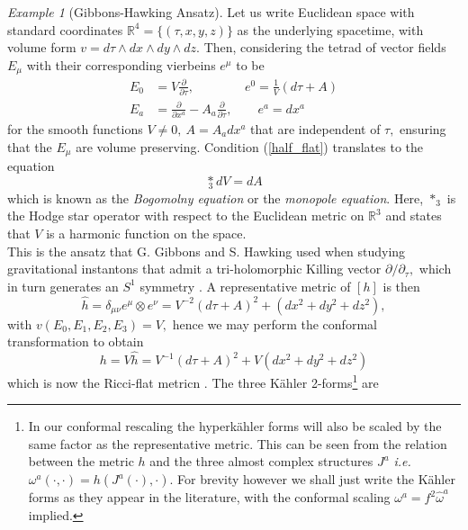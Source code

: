 \documentclass[a4paper,12pt, onecolumn, notitlepage]{article}
\theoremstyle{definition}
\theoremstyle{remark}
\newtheorem{ex}[thm]{Example}
\newcommand{\ie}{\emph{i.e.} }
\newcommand{\w}{\omega}
\newcommand{\m}{\mu}
\newcommand{\n}{\nu}
\newcommand{\ddt}[1]{\frac{\partial #1}{\partial \tau}}
\newcommand{\dd}[2]{\frac{\partial #1}{\partial #2}}
\newcommand{\K}{K\"ahler }
\newcommand{\HK}{hyperk\"ahler }
\newcommand{\x}[1]{x^{#1}}
\newcommand{\R}{\mathbb{R}}
\begin{document}
\begin{ex}[Gibbons-Hawking Ansatz]
	Let us write Euclidean space with standard coordinates $\R^{4} = \{(\tau,x,y,z)\}$ as the underlying spacetime, with volume form $v=d\tau\wedge dx\wedge dy\wedge dz.$ Then, considering the tetrad of vector fields $E_{\m}$ with their corresponding vierbeins $e^{\m}$ to be
	\begin{align*}
	\label{gh_vectors}
		E_{0} &= V\dd{}{\tau},\qquad\qquad e^{0} = \frac{1}{V}(d\tau+A)\\
		E_{a} &= \dd{}{\x{a}} - A_{a}\ddt{},\qquad e^{a} = dx^{a}
	\end{align*}
	for the smooth functions $V\neq0,\ A = A_{a}dx^{a}$ that are independent of $\tau,$ ensuring that the $E_{\m}$ are volume preserving. Condition (\ref{half_flat}) translates to the equation
	\begin{equation}
	\label{monopole}
		\underset{3}\ast dV = dA
	\end{equation}
	which is known as the 
	\emph{Bogomolny equation} or the \emph{monopole equation}. Here, $\ast_{3}$ is the Hodge star operator with respect to the Euclidean metric on $\R^{3}$ and states that $V$ is a harmonic function on the space.\\
	This is the ansatz that G. Gibbons and S. Hawking used when studying gravitational instantons that admit a tri-holomorphic Killing vector $\partial/\partial_{\tau},$ which in turn generates an $S^{1}$ symmetry \cite{gibbons_1978}. A representative metric of $[h]$ is then
	\begin{equation*}
		\hat{h}=\delta_{\m\n}e^{\m}\otimes e^{\n} = V^{-2}(d\tau + A)^{2} + (dx^{2} + dy^{2} + dz^{2}),
	\end{equation*}
	with $v(E_{0},E_{1},E_{2},E_{3})=V,$ hence we may perform the conformal transformation to obtain
	\begin{equation}
		\label{gh_metric}
		h = V\hat{h} =  V^{-1}(d\tau + A)^{2} + V(dx^{2} + dy^{2} + dz^{2})
	\end{equation}
	which is now the Ricci-flat metricn \cite{solitons}. 
	The three \K 2-forms\footnote{In our conformal rescaling the \HK forms will also be scaled by the same factor as the representative metric. This can be seen from the relation between the metric $h$ and the three almost complex structures $J^{a}$ \ie $\w^{a}(\cdot,\cdot) = h(J^{a}(\cdot),\cdot).$ For brevity however we shall just write the \K forms as they appear in the literature, with the conformal scaling $\w^{a} = f^{2}\hat{\w}^{a}$ implied.} are

\end{ex}
\end{document}
